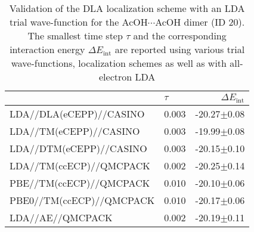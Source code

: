 \begin{table}
\caption{\label{tab:acetic_acid_validation}Validation of the DLA localization scheme with an LDA trial wave-function for the AcOH$\cdots$AcOH dimer (ID 20). The smallest time step $\tau$ and the corresponding interaction energy $\Delta E_\textrm{int}$ are reported using various trial wave-functions, localization schemes as well as with all-electron LDA}
\begin{adjustbox}{center}
\begin{tabular}{llr}
\toprule
 & $\tau$ & $\Delta E_\textrm{int}$ \\ 
\midrule
LDA//DLA(eCEPP)//CASINO & 0.003 & -20.27$\pm$0.08 \\
LDA//TM(eCEPP)//CASINO & 0.003 & -19.99$\pm$0.08 \\
LDA//DTM(eCEPP)//CASINO & 0.003 & -20.15$\pm$0.10 \\
LDA//TM(ccECP)//QMCPACK & 0.002 & -20.25$\pm$0.14 \\
PBE//TM(ccECP)//QMCPACK & 0.010 & -20.10$\pm$0.06 \\
PBE0//TM(ccECP)//QMCPACK & 0.010 & -20.17$\pm$0.06 \\
LDA//AE//QMCPACK & 0.002 & -20.19$\pm$0.11 \\
\bottomrule
\end{tabular}
\end{adjustbox}
\end{table}